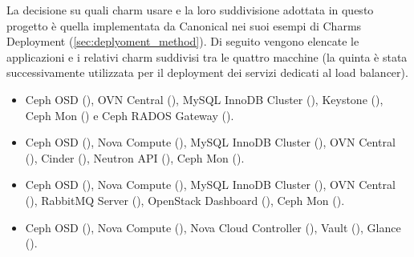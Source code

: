 La decisione su quali charm usare e la loro suddivisione adottata in questo progetto è quella implementata da Canonical nei suoi esempi di Charms Deployment (\cref{sec:deplyoment_method}).
% 
Di seguito vengono elencate le applicazioni e i relativi charm suddivisi tra le quattro macchine (la quinta è stata successivamente utilizzata per il deployment dei servizi dedicati al load balancer).

\begin{itemize}
    \footnotesize
    \item Ceph OSD (), OVN Central (), MySQL InnoDB Cluster (), Keystone (), Ceph Mon () e Ceph RADOS Gateway ().

    \item Ceph OSD (), Nova Compute (), MySQL InnoDB Cluster (), OVN Central (), Cinder (), Neutron API (), Ceph Mon ().

    \item Ceph OSD (), Nova Compute (), MySQL InnoDB Cluster (), OVN Central (), RabbitMQ Server (), OpenStack Dashboard (), Ceph Mon ().

    \item Ceph OSD (), Nova Compute (), Nova Cloud Controller (), Vault (), Glance ().
\end{itemize}



    


    
